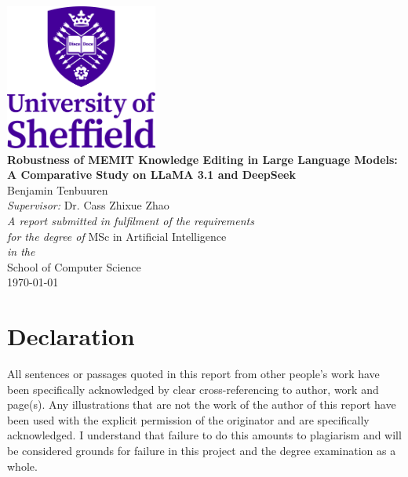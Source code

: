 \documentclass[11pt,oneside]{book}
\begin{document}
\frontmatter

\begin{titlepage}


\begin{center}
\includegraphics[width=5cm]{images/UOSLogo_Portrait_Violet_RGB.png}\\[2cm]
\linespread{1.2}\huge {\bfseries Robustness of MEMIT Knowledge Editing in Large Language Models: A Comparative Study on LLaMA 3.1 and DeepSeek}\\[2cm]
\linespread{1}
{\Large Benjamin Tenbuuren}\\[1cm]
{\large \emph{Supervisor:} Dr. Cass Zhixue Zhao}\\[1cm]
\large \emph{A report submitted in fulfilment of the requirements}\\ \emph{for the degree of} MSc in Artificial Intelligence\\[0.3cm] 
\textit{in the}\\[0.3cm]
School of Computer Science\\[2cm]
\today
\end{center}

\end{titlepage}


\newpage
\chapter*{\Large Declaration}


All sentences or passages quoted in this report from other people's work have been specifically acknowledged by clear cross-referencing to author, work and page(s). Any illustrations that are not the work of the author of this report have been used with the explicit permission of the originator and are specifically acknowledged. I understand that failure to do this amounts to plagiarism and will be considered grounds for failure in this project and the degree examination as a whole.\\[1cm]
\end{document}
